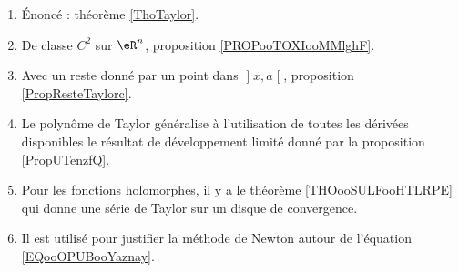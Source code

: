 
    \begin{enumerate}
    \item
        Énoncé : théorème \ref{ThoTaylor}.
    \item
        De classe \( C^2\) sur \( \eR^n\), proposition \ref{PROPooTOXIooMMlghF}.
    \item
    Avec un reste donné par un point dans \( \mathopen] x , a \mathclose[\), proposition \ref{PropResteTaylorc}.

        \item
            Le polynôme de Taylor généralise à l'utilisation de toutes les dérivées disponibles le résultat de développement limité donné par la proposition \ref{PropUTenzfQ}.
        \item
            Pour les fonctions holomorphes, il y a le théorème \ref{THOooSULFooHTLRPE} qui donne une série de Taylor sur un disque de convergence.
        \item
            Il est utilisé pour justifier la méthode de Newton autour de l'équation \eqref{EQooOPUBooYaznay}.
        \end{enumerate}

